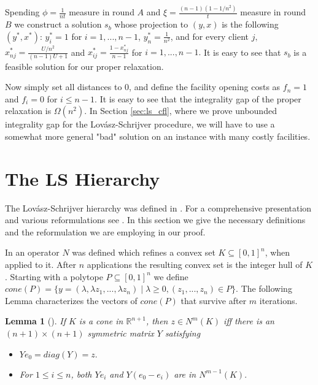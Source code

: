 \documentclass[11pt]{article}\usepackage{amsmath}
\newtheorem{lemma}{Lemma}[section]
\begin{document}
Spending $\phi=\frac{1}{nt}$ measure in round $A$ and $\xi=\frac{(n-1)(1-1/n^2)}{t}$ 
measure in round $B$ we construct a solution $s_b$ whose projection to $(y,x)$ is the 
following $(y^*,x^*)$:
$y^*_i=1$ for $i=1,...,n-1$, $y^*_n=\frac{1}{n^2}$, and for every client $j,$ $x^*_{nj}=\frac{U/n^2}{(n-1)U+1}$ and 
$x^*_{ij}=\frac{1-x^*_{nj}}{n-1}$ for $i=1,...,n-1.$ It is easy to see that $s_b$ is
a feasible solution for our proper relaxation.

Now simply set all distances to $0$, and define the facility opening costs as 
$f_n=1$ and $f_i=0$ for $i\leq n-1.$ It is easy to see
that the integrality gap of the proper relaxation is $\Omega (n^2)$. 
In Section \ref{sec:ls_cfl}, where we prove unbounded integrality gap for the
Lov\'{a}sz-Schrijver procedure, 
 we will have to use a somewhat more general "bad" solution on an instance with 
 many costly facilities.




\section{The LS Hierarchy}
\label{sec:ls}

The Lov\'{a}sz-Schrijver hierarchy was defined in \cite{LovaszS91}. For a 
comprehensive presentation and 
various reformulations see \cite{Tulsiani11-chapter}. In this section
we give the necessary definitions and the reformulation we are
employing in our proof. 

In \cite{LovaszS91} an operator $N$ was defined which refines a convex set 
$K \subseteq [0,1]^n$, when applied to  it.
After $n$ applications the resulting convex set is the integer hull of $K$. 
Starting with a polytope $P \subseteq [0,1]^n$ we define
$cone(P)=\{y = (\lambda, \lambda z_1,... , \lambda z_n) \mid  \lambda \geq 0, (z_1,...,z_n) \in P\}$.
The following Lemma characterizes the vectors  of $cone(P)$ 
that survive  after $m$ iterations.

\begin{lemma} [\cite{LovaszS91}]\label{lemmals}
 If $K$ is a cone in $\mathbb{R}^{n+1}$, then $z \in N^m(K)$ iff there is an $(n+1)\times (n+1)$ symmetric
matrix $Y$ satisfying
\begin{itemize}
\item[1.] $Ye_0=diag(Y)=z.$
\item[2.] For $1 \leq i \leq n$, both $Ye_i$ and $Y(e_0-e_i)$ are in $N^{m-1}(K).$
\end{itemize}
\end{lemma}
\end{document}
